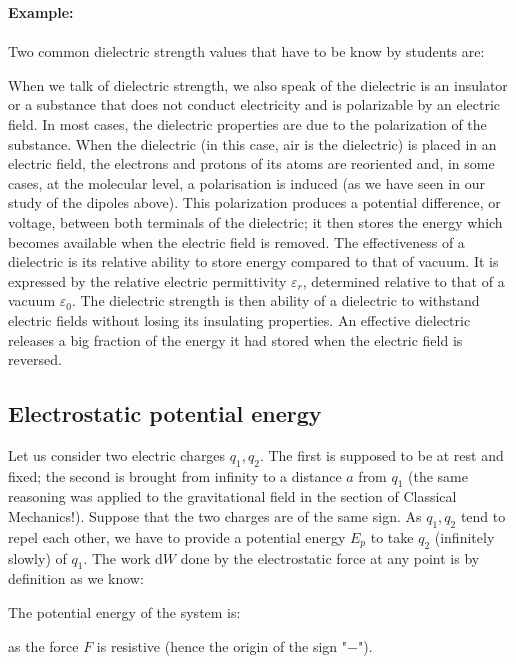 	\begin{tcolorbox}[colframe=black,colback=white,sharp corners]
	\textbf{{\Large {}}Example:}\\\\
	Two common dielectric strength values that have to be know by students are:
	
	\end{tcolorbox}
	When we talk of dielectric strength, we also speak of the dielectric is an insulator or a substance that does not conduct electricity and is polarizable by an electric field. In most cases, the dielectric properties are due to the polarization of the substance. When the dielectric (in this case, air is the dielectric) is placed in an electric field, the electrons and protons of its atoms are reoriented and, in some cases, at the molecular level, a polarisation is induced (as we have seen in our study of the dipoles above). This polarization produces a potential difference, or voltage, between both terminals of the dielectric; it then stores the energy which becomes available when the electric field is removed. The effectiveness of a dielectric is its relative ability to store energy compared to that of vacuum. It is expressed by the relative electric permittivity $\varepsilon_r$, determined relative to that of a vacuum $\varepsilon_0$. The dielectric strength is then ability of a dielectric to withstand electric fields without losing its insulating properties. An effective dielectric releases a big fraction of the energy it had stored when the electric field is reversed.
	
	\subsection{Electrostatic potential energy}\label{electrostatic potential energy}
	Let us consider two electric charges $q_1,q_2$. The first is supposed to be at rest and fixed; the second is brought from infinity to a distance $a$ from $q_1$ (the same reasoning was applied to the gravitational field in the section of Classical Mechanics!). Suppose that the two charges are of the same sign. As $q_1,q_2$ tend to repel each other, we have to provide a potential energy $E_p$ to take $q_2$ (infinitely slowly) of $q_1$. The work $\mathrm{d}W$ done by the electrostatic force at any point is by definition as we know:
	
	The potential energy of the system is:
	
	as the force $F$ is resistive (hence the origin of the sign "$-$").

